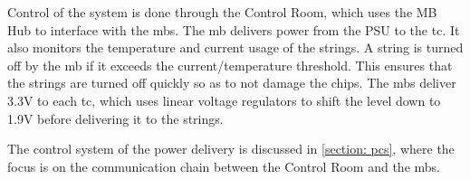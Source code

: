 \documentclass[main.tex]{subfiles}
\begin{document}
Control of the system is done through the Control Room, which uses the MB Hub to interface with the \gls{mb}s. The \gls{mb} delivers power from the PSU to the \gls{tc}. It also monitors the temperature and current usage of the strings. A string is turned off by the \gls{mb} if it exceeds the current/temperature threshold. This ensures that the strings are turned off quickly so as to not damage the chips. The \gls{mb}s deliver 3.3V to each \gls{tc}, which uses linear voltage regulators to shift the level down to 1.9V before delivering it to the strings.

The control system of the power delivery is discussed in \autoref{section: pcs}, where the focus is on the communication chain between the Control Room and the \gls{mb}s.
\end{document}

